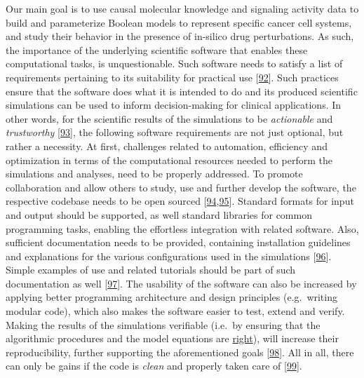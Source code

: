 \documentclass[
  12pt,
]{book}
\begin{document}
Our main goal is to use causal molecular knowledge and signaling activity data to build and parameterize Boolean models to represent specific cancer cell systems, and study their behavior in the presence of in-silico drug perturbations.
As such, the importance of the underlying scientific software that enables these computational tasks, is unquestionable.
Such software needs to satisfy a list of requirements pertaining to its suitability for practical use {[}\protect\hyperlink{ref-Wilson2014}{92}{]}.
Such practices ensure that the software does what it is intended to do and its produced scientific simulations can be used to inform decision-making for clinical applications.
In other words, for the scientific results of the simulations to be \emph{actionable} and \emph{trustworthy} {[}\protect\hyperlink{ref-Coveney2021}{93}{]}, the following software requirements are not just optional, but rather a necessity.
At first, challenges related to automation, efficiency and optimization in terms of the computational resources needed to perform the simulations and analyses, need to be properly addressed.
To promote collaboration and allow others to study, use and further develop the software, the respective codebase needs to be open sourced {[}\protect\hyperlink{ref-Barnes2010}{94},\protect\hyperlink{ref-Prlic2012}{95}{]}.
Standard formats for input and output should be supported, as well standard libraries for common programming tasks, enabling the effortless integration with related software.
Also, sufficient documentation needs to be provided, containing installation guidelines and explanations for the various configurations used in the simulations {[}\protect\hyperlink{ref-Karimzadeh2018}{96}{]}.
Simple examples of use and related tutorials should be part of such documentation as well {[}\protect\hyperlink{ref-List2017}{97}{]}.
The usability of the software can also be increased by applying better programming architecture and design principles (e.g.~writing modular code), which also makes the software easier to test, extend and verify.
Making the results of the simulations verifiable (i.e.~by ensuring that the algorithmic procedures and the model equations are \protect\hyperlink{gtrr}{right}), will increase their reproducibility, further supporting the aforementioned goals {[}\protect\hyperlink{ref-Sandve2013}{98}{]}.
All in all, there can only be gains if the code is \emph{clean} and properly taken care of {[}\protect\hyperlink{ref-Martin2009}{99}{]}.
\end{document}
